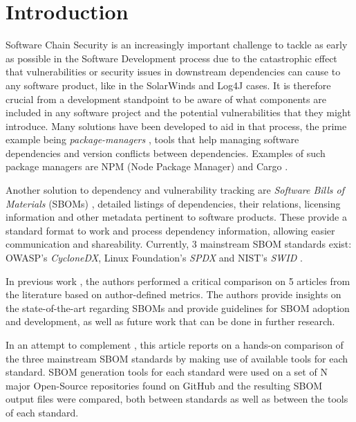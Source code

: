 \section{Introduction}

Software Chain Security is an increasingly important challenge to tackle as early as possible in the Software Development process due to the catastrophic effect that vulnerabilities or security issues in downstream dependencies can cause to any software product, like in the SolarWinds \cite{SolarWinds} and Log4J \cite{logj4} cases. It is therefore crucial from a development standpoint to be aware of what components are included in any software project and the potential vulnerabilities that they might introduce.
Many solutions have been developed to aid in that process, the prime example being \emph{package-managers} \cite{article:package-manager}, tools that help managing software dependencies and version conflicts between dependencies. Examples of such package managers are NPM (Node Package Manager) and Cargo \cite{tools:pkg-mngr:npm,tools:pkg-mngr:cargo}.

Another solution to dependency and vulnerability tracking are \emph{Software Bills of Materials} (SBOMs) \cite{article:concept:sbom-2}, detailed listings of dependencies, their relations, licensing information and other metadata pertinent to software products. These provide a standard format to work and process dependency information, allowing easier communication and shareability.
Currently, 3 mainstream SBOM standards exist: OWASP's \emph{CycloneDX}, Linux Foundation's \emph{SPDX} and NIST's \emph{SWID} \cite{standards:sbom:cyclonedx,standards:sbom:spdx,standards:sbom:swid}.

In previous work \cite{article:concept:sbom-sota-review}, the authors performed a critical comparison on 5 articles from the literature \cite{article:business-sbom,article:software-bom,article:sbom-required,article:sbom-study,article:sboms-issues-solutions} based on author-defined metrics. The authors provide insights on the state-of-the-art regarding SBOMs and provide guidelines for SBOM adoption and development, as well as future work that can be done in further research.

In an attempt to complement \cite{article:concept:sbom-sota-review}, this article reports on a hands-on comparison of the three mainstream SBOM standards by making use of available tools for each standard. SBOM generation tools for each standard were used on a set of N major Open-Source repositories found on GitHub and the resulting SBOM output files were compared, both between standards as well as between the tools of each standard.